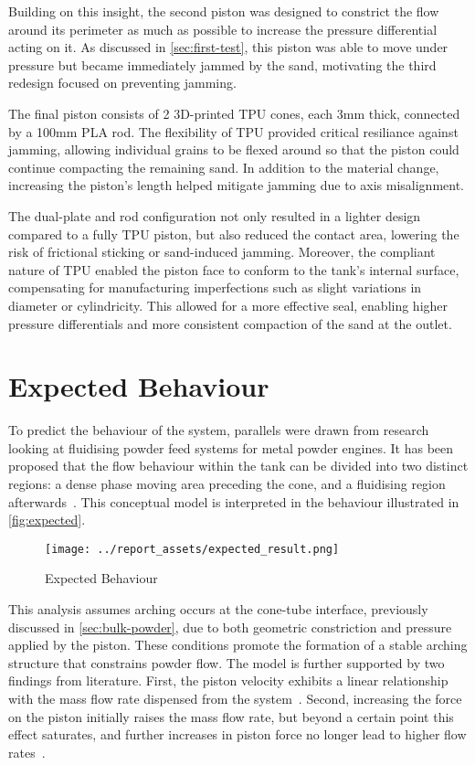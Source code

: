 Building on this insight, the second piston was designed to constrict the flow around its perimeter as much as possible to increase the pressure differential acting on it. As discussed in \autoref{sec:first-test}, this piston was able to move under pressure but became immediately jammed by the sand, motivating the third redesign focused on preventing jamming.

The final piston consists of 2 3D-printed TPU cones, each 3mm thick, connected by a 100mm PLA rod. The flexibility of TPU provided critical resiliance against jamming, allowing individual grains to be flexed around so that the piston could continue compacting the remaining sand. In addition to the material change, increasing the piston's length helped mitigate jamming due to axis misalignment. 

The dual-plate and rod configuration not only resulted in a lighter design compared to a fully TPU piston, but also reduced the contact area, lowering the risk of frictional sticking or sand-induced jamming. Moreover, the compliant nature of TPU enabled the piston face to conform to the tank's internal surface, compensating for manufacturing imperfections such as slight variations in diameter or cylindricity. This allowed for a more effective seal, enabling higher pressure differentials and more consistent compaction of the sand at the outlet.

\section{Expected Behaviour}\label{sec:expected-behaviour}
To predict the behaviour of the system, parallels were drawn from research looking at fluidising powder feed systems for metal powder engines. It has been proposed that the flow behaviour within the tank can be divided into two distinct regions: a dense phase moving area preceding the cone, and a fluidising region afterwards~\cite{Tang22}. This conceptual model is interpreted in the behaviour illustrated in \autoref{fig:expected}. 
\begin{figure}[htbp]
    \centering
    
    \begin{minipage}{0.6\textwidth}
        \centering
        \texttt{[image: ../report\_assets/expected\_result.png]}
        \caption{Expected Behaviour}\label{fig:expected}
    \end{minipage}
    
\end{figure}
This analysis assumes arching occurs at the cone-tube interface, previously discussed in \autoref{sec:bulk-powder}, due to both geometric constriction and pressure applied by the piston. These conditions promote the formation of a stable arching structure that constrains powder flow. The model is further supported by two findings from literature. First, the piston velocity exhibits a linear relationship with the mass flow rate dispensed from the system~\cite{SUN201630}. Second, increasing the force on the piston initially raises the mass flow rate, but beyond a certain point this effect saturates, and further increases in piston force no longer lead to higher flow rates~\cite{LI2021712}.

